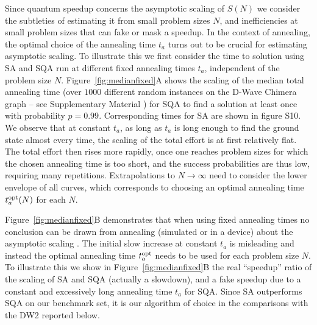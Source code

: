 Since quantum speedup concerns the asymptotic scaling of $S(N)$ we consider the subtleties of estimating it from small problem sizes $N$, and inefficiencies at small problem sizes that can fake or mask a speedup. In the context of annealing, the optimal choice of the annealing time $t_a$ turns out to be crucial for estimating asymptotic scaling. To illustrate this we first consider the time to solution using SA and SQA run at different {fixed} annealing times $t_a$, independent of the problem size $N$. Figure~\ref{fig:medianfixed}A shows the scaling of the median total annealing time (over $1000$ different random instances on the D-Wave Chimera graph -- see Supplementary Material \cite{SM}) for SQA to find a solution at least once with probability $p=0.99$. Corresponding times for SA are shown in figure S10. We observe that at constant $t_a$, as long as $t_a$ is long enough to find the ground state almost every time, the scaling of the total effort is at first relatively flat. The total effort then rises more rapidly, once one reaches problem sizes for which the chosen annealing time is too short, and the success probabilities are thus low, requiring many repetitions. Extrapolations to $N\rightarrow\infty$ need to consider the lower envelope of all curves, which corresponds to choosing an optimal annealing time $t_a^{\rm opt}(N)$ for each $N$.

Figure~\ref{fig:medianfixed}B demonstrates that when using fixed annealing times no conclusion can be drawn from annealing (simulated or in a device) about the asymptotic scaling . The initial slow increase at constant $t_a$ is misleading and instead the optimal annealing time $t_a^{\rm opt}$ needs to be used for each problem size $N$. To illustrate this we show in Figure~\ref{fig:medianfixed}B the real ``speedup'' ratio of the scaling of SA and SQA (actually a slowdown), and a  fake speedup due to a constant and excessively long annealing time $t_a$ for SQA. Since SA outperforms SQA on our benchmark set, it is our algorithm of choice in the comparisons with the DW2 reported below.



